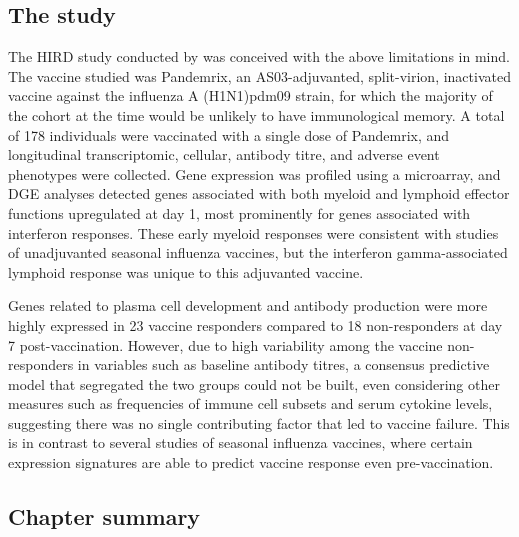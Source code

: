 \subsection{The  study}

The \gls{HIRD} study conducted by \textcite{sobolev2016AdjuvantedInfluenzaH1N1Vaccination} was conceived with the above limitations in mind.
The vaccine studied was Pandemrix, an AS03-adjuvanted, split-virion, inactivated vaccine against the influenza A (H1N1)pdm09 strain, for which the majority of the cohort at the time would be unlikely to have immunological memory.
A total of 178 individuals were vaccinated with a single dose of Pandemrix, and longitudinal transcriptomic, cellular, antibody
titre, and adverse event phenotypes were collected.
Gene expression was profiled using a microarray, and \gls{DGE} analyses detected genes associated with both myeloid and lymphoid effector functions upregulated at day 1, most prominently for genes associated with interferon responses.
These early myeloid responses were consistent with studies of unadjuvanted seasonal influenza vaccines, but the interferon gamma-associated lymphoid response was unique to this adjuvanted vaccine.

Genes related to plasma cell development and antibody production were more highly expressed in 23 vaccine responders compared to 18 non-responders at day 7 post-vaccination.
However, due to high variability among the vaccine non-responders in variables such as baseline antibody titres, a consensus predictive model that segregated the two groups could not be built, even considering other measures such as frequencies of immune cell subsets and serum cytokine levels, suggesting there was no single contributing factor that led to vaccine failure.
This is in contrast to several studies of seasonal influenza vaccines, where certain expression signatures are able to predict vaccine response even pre-vaccination\autocite{furman2013ApoptosisOtherImmune, tsang2014GlobalAnalysesHuman, nakaya2015SystemsAnalysisImmunity, hipc-chisignaturesprojectteam2017MulticohortAnalysisReveals}.

\subsection{Chapter summary}

